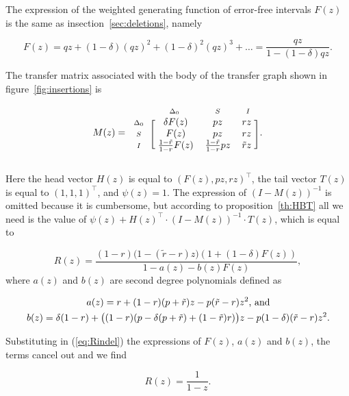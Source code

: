 \documentclass{article}
\newcommand{\smI}{\scriptstyle{I}}
\newcommand{\smS}{\scriptstyle{S}}
\newcommand{\smDELz}{\scriptstyle{\Delta_0}}
\begin{document}
The expression of the weighted generating function of error-free intervals
$F(z)$ is the same as insection~\ref{sec:deletions}, namely

\begin{equation*}
F(z) = qz + (1-\delta)(qz)^2 + (1-\delta)^2(qz)^3 + \ldots =
\frac{qz}{1-(1-\delta)qz}.
\end{equation*}

The transfer matrix associated with the body of the transfer graph shown
in figure~\ref{fig:insertions} is

\begin{equation*}
M(z) = 
\begin{blockarray}{cccc}
       & \smDELz & \smS & \smI \\
\begin{block}{c[ccc]}
\smDELz & \; \delta F(z) & pz & rz \; \\
\smS    & \;        F(z) & pz & rz \; \\
\smI    & \; \frac{1-\tilde{r}}{1-r}F(z)
           & \frac{1-\tilde{r}}{1-r}pz & \tilde{r}z \; \\
\end{block}
\end{blockarray}.
\end{equation*}

Here the head vector $H(z)$ is equal to $(F(z), pz, rz)^\top$, the tail
vector $T(z)$ is equal to $(1,1,1)^\top$, and $\psi(z) = 1$. The
expression of $(I-M(z))^{-1}$ is omitted because it is cumbersome, but
according to proposition~\ref{th:HBT} all we need is the value of
$\psi(z)+H(z)^\top \cdot (I-M(z))^{-1} \cdot T(z)$, which is equal to

\begin{equation}
\label{eq:Rindel}
R(z) = \frac{(1-r)\big( 1-(\tilde{r}-r)z \big)
\left(1+(1-\delta)F(z) \right)}{1-a(z)-b(z)F(z)},
\end{equation}
where $a(z)$ and $b(z)$ are second degree polynomials defined as

\begin{gather}
\label{eq:a+b}
a(z) = r+(1-r)(p+\tilde{r})z
- p(\tilde{r}-r)z^2\text{, and} \\
b(z) = \delta(1-r) +
\big((1-r)(p-\delta(p+\tilde{r})+(1-\tilde{r})r)\big)z
-p(1-\delta)(\tilde{r}-r)z^2.
\notag
\end{gather}

Substituting in (\ref{eq:Rindel}) the expressions of $F(z)$, $a(z)$ and
$b(z)$, the terms cancel out and we find

\begin{equation}
R(z) = \frac{1}{1-z}.
\end{equation}
\end{document}
